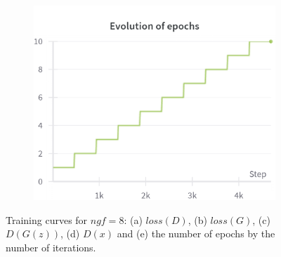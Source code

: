 \begin{figure}[H]
    \begin{subfigure}{0.45\textwidth}
        \centering
        \includegraphics[width=0.95\linewidth]{ngf/8/epochs.png}
        \caption{}
        \label{subfig:ngf/8/epochs}
    \end{subfigure}%

    \caption{Training curves for $ngf=8$: (a) $loss(D)$, (b) $loss(G)$, (c) $D(G(z))$, (d) $D(x)$ and (e) the number of epochs by the number of iterations.}
    \label{fig:ngf/8_losses}
\end{figure}

